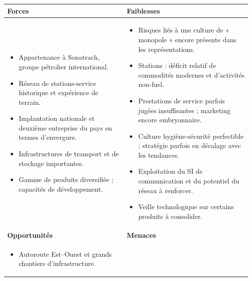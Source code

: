 \begin{table}[H]
\centering
\footnotesize
\begin{tabularx}{\textwidth}{@{}XX@{}}
\toprule
\textbf{Forces} & \textbf{Faiblesses} \\
\midrule
\begin{minipage}[t]{\linewidth}
\vspace{0pt}
\begin{itemize}
    \item Appartenance à Sonatrach, groupe pétrolier international.
    \item Réseau de stations-service historique et expérience de terrain.
    \item Implantation nationale et deuxième entreprise du pays en termes d'envergure.
    \item Infrastructures de transport et de stockage importantes.
    \item Gamme de produits diversifiée ; capacités de développement.
\end{itemize}
\end{minipage}
&
\begin{minipage}[t]{\linewidth}
\vspace{0pt}
\begin{itemize}
    \item Risques liés à une culture de « monopole » encore présente dans les représentations.
    \item Stations : déficit relatif de commodités modernes et d'activités non-fuel.
    \item Prestations de service parfois jugées insuffisantes ; marketing encore embryonnaire.
    \item Culture hygiène-sécurité perfectible ; stratégie parfois en décalage avec les tendances.
    \item Exploitation du SI de communication et du potentiel du réseau à renforcer.
    \item Veille technologique sur certains produits à consolider.
\end{itemize}
\end{minipage}
\\
\midrule
\textbf{Opportunités} & \textbf{Menaces} \\
\midrule
\begin{minipage}[t]{\linewidth}
\vspace{0pt}
\begin{itemize}
    \item Autoroute Est--Ouest et grands chantiers d'infrastructure.

\end{itemize}
\end{minipage}
\end{tabularx}
\end{table}

